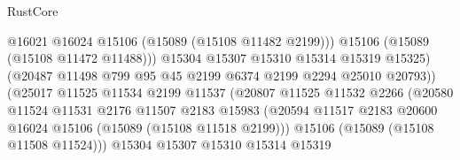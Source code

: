 \begin{lexlean}{RustCore}
\begin{coremodule}
                                            @16021
                                            @16024
                                            @15106
                                            (@15089 (@15108 @11482 @2199)))
                                          @15106
                                          (@15089 (@15108 @11472 @11488)))
                                        @15304
                                        @15307
                                        @15310
                                        @15314
                                        @15319
                                        @15325)
                                      (@20487
                                        @11498
                                        @799
                                        @95
                                        @45
                                        @2199
                                        @6374
                                        @2199
                                        @2294
                                        @25010
                                        @20793))
                                    (@25017
                                      @11525
                                      @11534
                                      @2199
                                      @11537
                                      (@20807
                                        @11525
                                        @11532
                                        @2266
                                        (@20580
                                          @11524
                                          @11531
                                          @2176
                                          @11507
                                          @2183
                                          @15983
                                          (@20594
                                            @11517
                                            @2183
                                            @20600
                                            @16024
                                            @15106
                                            (@15089 (@15108 @11518 @2199)))
                                          @15106
                                          (@15089 (@15108 @11508 @11524)))
                                        @15304
                                        @15307
                                        @15310
                                        @15314
                                        @15319

\end{coremodule}
\end{lexlean}
